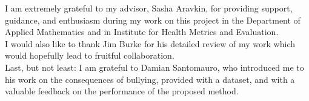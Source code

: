 I am extremely grateful to my advisor, Sasha Aravkin, for providing support, guidance, and enthusiasm during my work on this project in the Department of Applied Mathematics and in Institute for Health Metrics and Evaluation.\\
I would also like to thank Jim Burke for his detailed review of my work which would hopefully lead to fruitful collaboration. \\ 
Last, but not least: I am grateful to Damian Santomauro, who introduced me to his work on the consequences of bullying, provided with a dataset, and with a valuable feedback on the performance of the proposed method. \\
